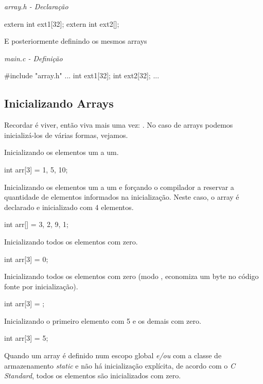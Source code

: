 \textit{array.h - Declaração}\\
\begin{ccode}
extern int ext1[32];
extern int ext2[];
\end{ccode}

E posteriormente definindo os mesmos arrays

\textit{main.c - Definição}\\
\begin{ccode}
#include "array.h"
...
int ext1[32];
int ext2[32];
...
\end{ccode}

\subsection{Inicializando Arrays}
Recordar é viver, então viva mais uma vez: . No caso de arrays podemos inicializá-los de várias formas, vejamos.

Inicializando os elementos um a um.

\begin{ccode}
  int arr[3] = {1, 5, 10};
\end{ccode}

Inicializando os elementos um a um e forçando o compilador a reservar a quantidade de elementos informados na inicialização. Neste caso, o array é declarado e inicializado com 4 elementos.

\begin{ccode}
  int arr[] = {3, 2, 9, 1};
\end{ccode}

Inicializando todos os elementos com zero.

\begin{ccode}
  int arr[3] = {0};
\end{ccode}

Inicializando todos os elementos com zero (modo , economiza um byte no código fonte por inicialização).

\begin{ccode}
  int arr[3] = {};
\end{ccode}

Inicializando o primeiro elemento com 5 e os demais com zero.

\begin{ccode}
  int arr[3] = {5};
\end{ccode}

Quando um array é definido num escopo global \textit{e/ou} com a classe de armazenamento \textit{static} e não há inicialização explícita, de acordo com o \textit{C Standard}, todos os elementos são inicializados com zero.

